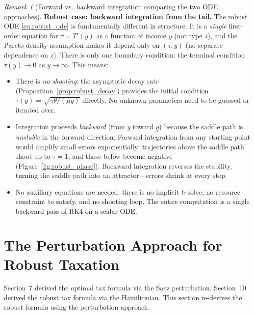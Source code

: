 \documentclass[12pt,a4paper]{article}
\theoremstyle{definition}
\theoremstyle{plain}
\theoremstyle{remark}
\newtheorem{remark}{Remark}[section]
\begin{document}
\begin{remark}[Forward vs.\ backward integration: comparing the two ODE approaches]
\medskip\noindent\textbf{Robust case: backward integration from the tail.}
The robust ODE \eqref{eq:robust_ode} is fundamentally different in structure. It is a \emph{single} first-order equation for $\tau = T'(y)$ as a function of income $y$ (not type $z$), and the Pareto density assumption makes it depend only on $(\tau, y)$ (no separate dependence on $z$). There is only one boundary condition: the terminal condition $\tau(y) \to 0$ as $y \to \infty$. This means:
\begin{itemize}
\item There is \emph{no shooting}: the asymptotic decay rate (Proposition~\ref{prop:robust_decay}) provides the initial condition $\tau(\bar{y}) = \sqrt{\gamma\theta/(\mu\bar{y})}$ directly. No unknown parameters need to be guessed or iterated over.
\item Integration proceeds \emph{backward} (from $\bar{y}$ toward $\underline{y}$) because the saddle path is \emph{unstable} in the forward direction. Forward integration from any starting point would amplify small errors exponentially: trajectories above the saddle path shoot up to $\tau = 1$, and those below become negative (Figure~\ref{fig:robust_phase}). Backward integration reverses the stability, turning the saddle path into an attractor---errors shrink at every step.
\item No auxiliary equations are needed: there is no implicit $h$-solve, no resource constraint to satisfy, and no shooting loop. The entire computation is a single backward pass of RK4 on a scalar ODE.
\end{itemize}
\end{remark}



\section{The Perturbation Approach for Robust Taxation}
\label{sec:robust_perturbation}

Section~7 derived the optimal tax formula via the Saez
perturbation.  Section~10 derived the robust tax formula
via the Hamiltonian.  This section re-derives the robust
formula using the perturbation approach.
\end{document}
